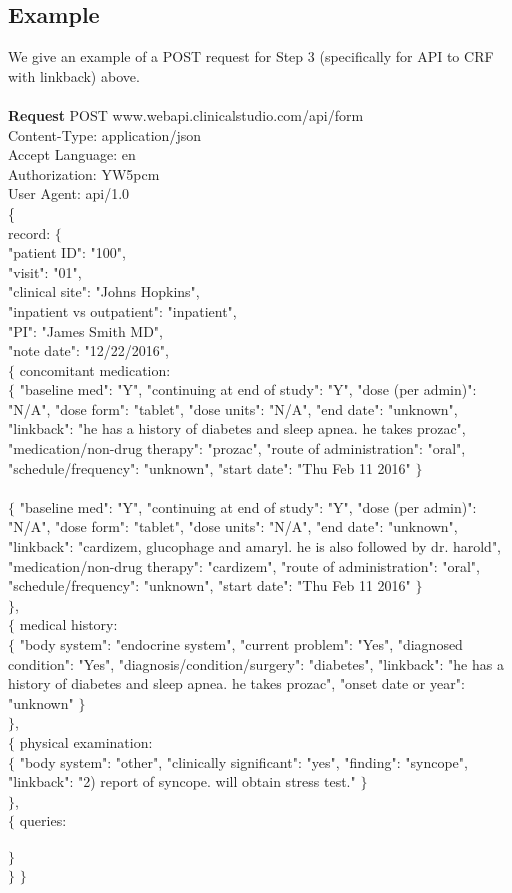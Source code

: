 \documentclass[12pt]{article}
\begin{document}
\subsection{Example}
We give an example of a POST request for Step 3 (specifically for API to CRF with linkback) above. 
\\
\\
{\bfseries Request} POST www.webapi.clinicalstudio.com/api/form
\\
Content-Type: application/json
\\
Accept Language: en
\\
Authorization: YW5pcm
\\
User Agent: api/1.0
\\
\{
\\
record: $\{$ 
\\
"patient ID": "100",
\\
"visit": "01",
\\
"clinical site": "Johns Hopkins",
\\
"inpatient vs outpatient": "inpatient",
\\
"PI": "James Smith MD",
\\
"note date": "12/22/2016",
\\
$\{$ concomitant medication:
\\
\indent $\{$ "baseline med": "Y", "continuing at end of study": "Y", "dose (per admin)": "N/A", "dose form": "tablet", "dose units": "N/A", "end date": "unknown", "linkback": "he has a history of diabetes and sleep apnea. he takes prozac", "medication/non-drug therapy": "prozac", "route of administration": "oral", "schedule/frequency": "unknown", "start date": "Thu Feb 11 2016" $\}$
\\
\\
\indent $\{$ "baseline med": "Y", "continuing at end of study": "Y", "dose (per admin)": "N/A", "dose form": "tablet", "dose units": "N/A", "end date": "unknown", "linkback": "cardizem, glucophage and amaryl. he is also followed by dr. harold", "medication/non-drug therapy": "cardizem", "route of administration": "oral", "schedule/frequency": "unknown", "start date": "Thu Feb 11 2016" $\}$
\\
\indent $\}$,
\\
$\{$ medical history:
\\
\indent $\{$ "body system": "endocrine system", "current problem": "Yes", "diagnosed condition": "Yes", "diagnosis/condition/surgery": "diabetes", "linkback": "he has a history of diabetes and sleep apnea. he takes prozac", "onset date or year": "unknown" $\}$
\\
\indent $\}$,
\\
$\{$ physical examination:
\\
\indent $\{$ "body system": "other", "clinically significant": "yes", "finding": "syncope", "linkback": "2) report of syncope. will obtain stress test." $\}$
\\
\indent $\}$,
\\
$\{$ queries:
\\
\\
\indent $\}$
\\
$\}$
$\}$
\end{document}
